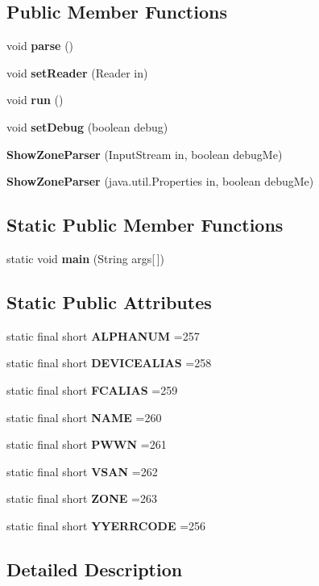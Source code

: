 \subsection*{Public Member Functions}
\begin{DoxyCompactItemize}
\item 
void {\bf parse} ()
\item 
void {\bf set\-Reader} (Reader in)
\item 
void {\bf run} ()
\item 
void {\bf set\-Debug} (boolean debug)
\item 
{\bf Show\-Zone\-Parser} (Input\-Stream in, boolean debug\-Me)
\item 
{\bf Show\-Zone\-Parser} (java.\-util.\-Properties in, boolean debug\-Me)
\end{DoxyCompactItemize}
\subsection*{Static Public Member Functions}
\begin{DoxyCompactItemize}
\item 
static void {\bf main} (String args[$\,$])
\end{DoxyCompactItemize}
\subsection*{Static Public Attributes}
\begin{DoxyCompactItemize}
\item 
static final short {\bf A\-L\-P\-H\-A\-N\-U\-M} =257
\item 
static final short {\bf D\-E\-V\-I\-C\-E\-A\-L\-I\-A\-S} =258
\item 
static final short {\bf F\-C\-A\-L\-I\-A\-S} =259
\item 
static final short {\bf N\-A\-M\-E} =260
\item 
static final short {\bf P\-W\-W\-N} =261
\item 
static final short {\bf V\-S\-A\-N} =262
\item 
static final short {\bf Z\-O\-N\-E} =263
\item 
static final short {\bf Y\-Y\-E\-R\-R\-C\-O\-D\-E} =256
\end{DoxyCompactItemize}


\subsection{Detailed Description}


